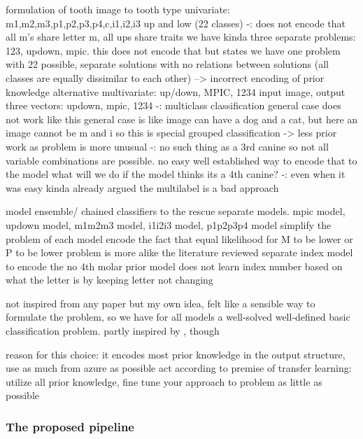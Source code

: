 \documentclass{article}
\begin{document}
formulation of tooth image to tooth type
    univariate: m1,m2,m3,p1,p2,p3,p4,c,i1,i2,i3 up and low (22 classes)
        -: does not encode that all m's share letter m, all ups share traits
        we have kinda three separate problems: 123, updown, mpic. this does not encode that 
        but states we have one problem with 22 possible, separate solutions with no relations between solutions
            (all classes are equally dissimilar to each other) --> incorrect encoding of prior knowledge
    alternative multivariate: up/down, MPIC, 1234
        input image, output three vectors: updown, mpic, 1234
            -: multiclass classification general case does not work like this 
                general case is like image can have a dog and a cat, but here an image cannot be m and i \cite{multilabel_classification}
                    so this is special grouped classification -> less prior work as problem is more unusual 
            -: no such thing as a 3rd canine 
                so not all variable combinations are possible. no easy well established way to encode that to the model 
                    what will we do if the model thinks its a 4th canine?
            -: even when it was easy \cite{tibetan_ocr} kinda already argued the multilabel is a bad approach

    model ensemble/ chained classifiers to the rescue
        separate models. mpic model, updown model, m1m2m3 model, i1i2i3 model, p1p2p3p4 model
            simplify the problem of each model
            encode the fact that equal likelihood for M to be lower or P to be lower
            problem is more alike the literature reviewed
            separate index model to encode
                the no 4th molar prior
                model does not learn index number based on what the letter is by keeping letter not changing

not inspired from any paper but my own idea, felt like a sensible way to formulate the problem, 
so we have for all models a well-solved well-defined basic classification problem. partly inspired by \cite{tibetan_ocr}, though

reason for this choice: it encodes most prior knowledge in the output structure, use as much from azure as possible
    act according to premise of transfer learning: utilize all prior knowledge, fine tune your approach to problem as little as possible

\subsubsection{The proposed pipeline}
\end{document}
